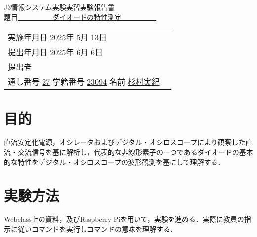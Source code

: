 \documentclass{jreport}  %
\begin{document}
\begin{titlepage}
\headlinefont
    \begin{center}
        \vspace*{2cm}
        {\fontsize{18pt}{20pt}\selectfont J3\quad 情報システム実験実習\quad 実験報告書} \\[2.2cm]
        {\fontsize{20pt}{20pt}\selectfont 題目\quad \underline{　　　　　ダイオードの特性測定　　　　　}} \\[3cm]
        \fontsize{14pt}{20pt}\selectfont \begin{tabular}{l l}
            実施年月日 \underline{2025年 5月 13日}& \\[0.5cm]
            提出年月日 \underline{2025年 6月 6日}& \\[4.0cm]
            提出者 & \\[0.5cm]
            通し番号 \underline{27} 学籍番号 \underline{23094} 名前 \underline{杉村実紀} \\
        \end{tabular}
        \vfill
    \end{center}
\end{titlepage}

\section{目的}
直流安定化電源，オシレータおよびデジタル・オシロスコープにより観察した直流・交流信号を基に解析し，代表的な非線形素子の一つであるダイオードの基本的な特性をデジタル・オシロスコープの波形観測を基にして理解する．

\section{実験方法}
Webclass上の資料，及びRaspberry Piを用いて，実験を進める．実際に教員の指示に従いコマンドを実行しコマンドの意味を理解する．
\end{document}
